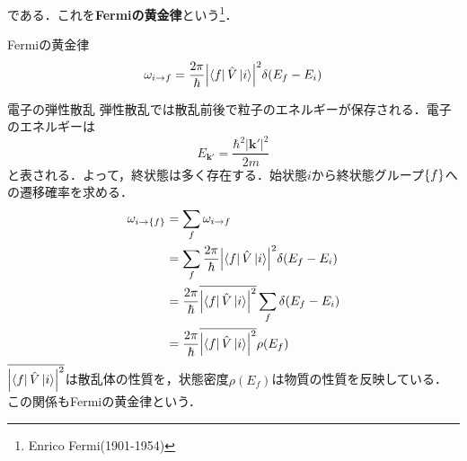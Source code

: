 \documentclass{report}
\begin{document}
  である．これを\textbf{Fermiの黄金律}という\footnote{Enrico Fermi(1901-1954)}．
  \begin{itembox}[l]{Fermiの黄金律}
    \begin{equation}
      \omega_{i\to f}=\frac{2\pi}{\hbar}\qty|\bra{f}\hat{V}\ket{i}|^2\delta(E_f-E_i)
    \end{equation}
  \end{itembox}
  \begin{myex}{}{}電子の弾性散乱
    弾性散乱では散乱前後で粒子のエネルギーが保存される．電子のエネルギーは
    \begin{equation}
      E_{\bm{k'}}=\frac{\hbar^2|\bm{k'}|^2}{2m}
    \end{equation}
    と表される．よって，終状態は多く存在する．始状態$i$から終状態グループ$\qty{f}$への遷移確率を求める．
    \begin{align}
      \omega_{i\to\qty{f}}&=\sum_{f}\omega_{i\to f}\\
      &=\sum_{f}\frac{2\pi}{\hbar}\qty|\bra{f}\hat{V}\ket{i}|^2\delta(E_f-E_i)\\
      &=\frac{2\pi}{\hbar}\overline{\qty|\bra{f}\hat{V}\ket{i}|^2}\sum_{f}\delta(E_f-E_i)\\
      &=\frac{2\pi}{\hbar}\overline{\qty|\bra{f}\hat{V}\ket{i}|^2}\rho(E_f)
    \end{align}
    $\overline{\qty|\bra{f}\hat{V}\ket{i}|^2}$は散乱体の性質を，状態密度$\rho(E_f)$は物質の性質を反映している．この関係もFermiの黄金律という．
  \end{myex}
\end{document}
